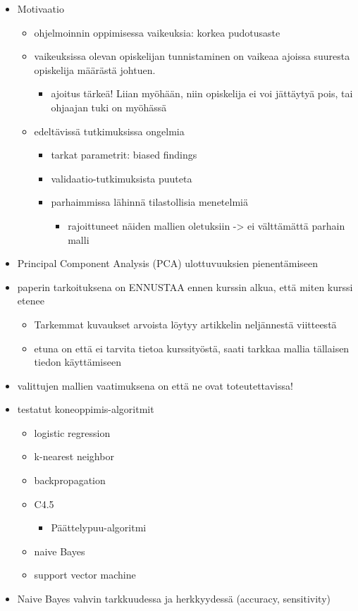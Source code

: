 \documentclass[finnish,twoside,openright]{HYgraduMLDS}
\begin{document}
\begin{itemize}
    \item Motivaatio
    \begin{itemize}
        \item ohjelmoinnin oppimisessa vaikeuksia: korkea pudotusaste
        \item vaikeuksissa olevan opiskelijan tunnistaminen on vaikeaa ajoissa suuresta opiskelija määrästä johtuen.
        \begin{itemize}
            \item ajoitus tärkeä! Liian myöhään, niin opiskelija ei voi jättäytyä pois, tai ohjaajan tuki on myöhässä
        \end{itemize}
        \item edeltävissä tutkimuksissa ongelmia
        \begin{itemize}
            \item tarkat parametrit: biased findings
            \item validaatio-tutkimuksista puuteta
            \item parhaimmissa lähinnä tilastollisia menetelmiä
            \begin{itemize}
                \item rajoittuneet näiden mallien oletuksiin -> ei välttämättä parhain malli
            \end{itemize}
        \end{itemize}
    \end{itemize}
    \item Principal Component Analysis (PCA) ulottuvuuksien pienentämiseen
    \item paperin tarkoituksena on ENNUSTAA ennen kurssin alkua, että miten kurssi etenee
    \begin{itemize}
        \item Tarkemmat kuvaukset arvoista löytyy artikkelin neljännestä viitteestä
        \item etuna on että ei tarvita tietoa kurssityöstä, saati tarkkaa mallia tällaisen tiedon käyttämiseen
    \end{itemize}
    \item valittujen mallien vaatimuksena on että ne ovat toteutettavissa!
    \item testatut koneoppimis-algoritmit
    \begin{itemize}
        \item logistic regression
        \item k-nearest neighbor
        \item backpropagation
        \item C4.5
        \begin{itemize}
            \item Päättelypuu-algoritmi
        \end{itemize}
        \item naive Bayes
        \item support vector machine
    \end{itemize}
    \item Naive Bayes vahvin tarkkuudessa ja herkkyydessä (accuracy, sensitivity)
\end{itemize}
\end{document}
